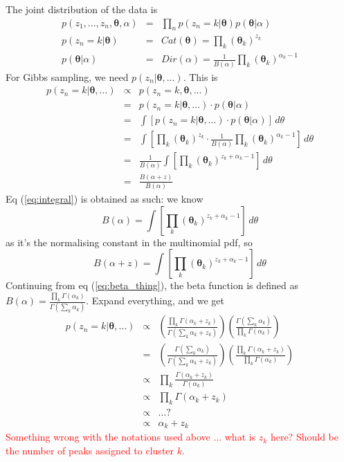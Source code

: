 \documentclass[12pt,a4paper]{article}
\newcommand\todo[1]{\textcolor{red}{#1}}
\begin{document}
The joint distribution of the data is 
\begin{eqnarray}
p(z_{1},...,z_{n},\boldsymbol{\theta},\alpha) & = & \prod_{n}p(z_{n}=k|\boldsymbol{\theta})p(\boldsymbol{\theta}|\alpha)\\
p(z_{n}=k|\boldsymbol{\theta}) & = & Cat(\boldsymbol{\theta})=\prod_{k}(\boldsymbol{\theta}_{k})^{z_{k}}\\
p(\boldsymbol{\theta}|\alpha) & = & Dir(\alpha)=\frac{1}{B(\alpha)}\prod_{k}(\boldsymbol{\theta}_{k})^{\alpha_{k}-1}
\end{eqnarray}
For Gibbs sampling, we need $p(z_{n}|\boldsymbol{\theta},...)$. This
is
\begin{eqnarray}
p(z_{n}=k|\boldsymbol{\theta},...) & \propto & p(z_{n}=k,\boldsymbol{\theta},...)\\
 & = & p(z_{n}=k|\boldsymbol{\theta},...)\cdot p(\boldsymbol{\theta}|\alpha)\\
 & = & \int\left[p(z_{n}=k|\boldsymbol{\theta},...)\cdot p(\boldsymbol{\theta}|\alpha)\right]\, d\theta\\
 & = & \int\left[\prod_{k}(\boldsymbol{\theta}_{k})^{z_{k}}\cdot\frac{1}{B(\alpha)}\prod_{k}(\boldsymbol{\theta}_{k})^{\alpha_{k}-1}\right]\, d\theta\\
 & = & \frac{1}{B(\alpha)}\int\left[\prod_{k}(\boldsymbol{\theta}_{k})^{z_{k}+\alpha_{k}-1}\right]\, d\theta\label{eq:integral}\\
 & = & \frac{B(\alpha+z)}{B(\alpha)}\label{eq:beta_thing}
\end{eqnarray}
Eq (\ref{eq:integral}) is obtained as such: we know 
\begin{equation}
B(\alpha)=\int\left[\prod_{k}(\boldsymbol{\theta}_{k})^{z_{k}+\alpha_{k}-1}\right]\, d\theta
\end{equation}
as it's the normalising constant in the multinomial pdf, so 
\begin{equation}
B(\alpha+z)=\int\left[\prod_{k}(\boldsymbol{\theta}_{k})^{z_{k}+\alpha_{k}-1}\right]\, d\theta
\end{equation}
Continuing from eq (\ref{eq:beta_thing}), the beta function is defined
as $B(\alpha)=\frac{\prod_{k}\Gamma(\alpha_{k})}{\Gamma(\sum_{k}\alpha_{k})}$.
Expand everything, and we get
\begin{eqnarray}
p(z_{n}=k|\boldsymbol{\theta},...) & \propto & \left(\frac{\prod_{k}\Gamma(\alpha_{k}+z_{k})}{\Gamma(\sum_{k}\alpha_{k}+z_{k})}\right)\left(\frac{\Gamma(\sum_{k}\alpha_{k})}{\prod_{k}\Gamma(\alpha_{k})}\right)\\
 & = & \left(\frac{\Gamma(\sum_{k}\alpha_{k})}{\Gamma(\sum_{k}\alpha_{k}+z_{k})}\right)\left(\frac{\prod_{k}\Gamma(\alpha_{k}+z_{k})}{\prod_{k}\Gamma(\alpha_{k})}\right)\\
 & \propto & \prod_{k}\frac{\Gamma(\alpha_{k}+z_{k})}{\Gamma(\alpha_{k})}\\
 & \propto & \prod_{k}\Gamma(\alpha_{k}+z_{k})\\
 & \propto & ...?\\
 & \propto & \alpha_{k}+z_{k}
\end{eqnarray}
\todo{Something wrong with the notations used above ... what is $z_{k}$ here? Should be the number of peaks assigned to cluster $k$.}



\nocite{*}


\end{document}
